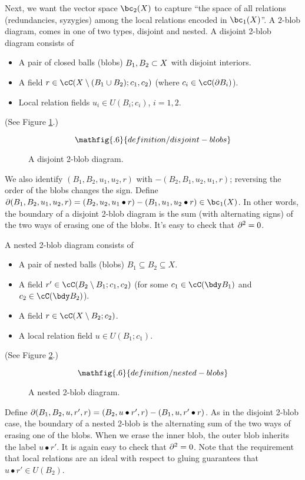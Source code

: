 Next, we want the vector space $\bc_2(X)$ to capture ``the space of all relations 
(redundancies, syzygies) among the 
local relations encoded in $\bc_1(X)$''.
A $2$-blob diagram, comes in one of two types, disjoint and nested.
A disjoint 2-blob diagram consists of
\begin{itemize}
\item A pair of closed balls (blobs) $B_1, B_2 \subset X$ with disjoint interiors.
\item A field $r \in \cC(X \setmin (B_1 \cup B_2); c_1, c_2)$
(where $c_i \in \cC(\bd B_i)$).
\item Local relation fields $u_i \in U(B_i; c_i)$, $i=1,2$.
\end{itemize}
(See Figure \ref{blob2ddiagram}.)
\begin{figure}[t]\begin{equation*}
\mathfig{.6}{definition/disjoint-blobs}
\end{equation*}\caption{A disjoint 2-blob diagram.}\label{blob2ddiagram}\end{figure}
We also identify $(B_1, B_2, u_1, u_2, r)$ with $-(B_2, B_1, u_2, u_1, r)$;
reversing the order of the blobs changes the sign.
Define $\bd(B_1, B_2, u_1, u_2, r) = 
(B_2, u_2, u_1\bullet r) - (B_1, u_1, u_2\bullet r) \in \bc_1(X)$.
In other words, the boundary of a disjoint 2-blob diagram
is the sum (with alternating signs)
of the two ways of erasing one of the blobs.
It's easy to check that $\partial^2 = 0$.

A nested 2-blob diagram consists of
\begin{itemize}
\item A pair of nested balls (blobs) $B_1 \subseteq B_2 \subseteq X$.
\item A field $r' \in \cC(B_2 \setminus B_1; c_1, c_2)$ 
(for some $c_1 \in \cC(\bdy B_1)$ and $c_2 \in \cC(\bdy B_2)$).
\item A field $r \in \cC(X \setminus B_2; c_2)$.
\item A local relation field $u \in U(B_1; c_1)$.
\end{itemize}
(See Figure \ref{blob2ndiagram}.)
\begin{figure}[t]\begin{equation*}
\mathfig{.6}{definition/nested-blobs}
\end{equation*}\caption{A nested 2-blob diagram.}\label{blob2ndiagram}\end{figure}
Define $\partial(B_1, B_2, u, r', r) = (B_2, u\bullet r', r) - (B_1, u, r' \bullet r)$.
As in the disjoint 2-blob case, the boundary of a nested 2-blob is the alternating
sum of the two ways of erasing one of the blobs.
When  we erase the inner blob, the outer blob inherits the label $u\bullet r'$.
It is again easy to check that $\partial^2 = 0$. Note that the requirement that
local relations are an ideal with respect to gluing guarantees that $u\bullet r' \in U(B_2)$.


